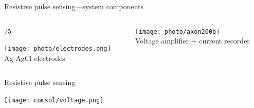 \begin{frame}[c]{Resistive pulse sensing---system components}
\begin{columns}[t]
	\end{columns}
	
	\vspace{1cm}
	
	\begin{columns}[t]
		\begin{column}[T]{\paperwidth/5}
			{\centering
				\texttt{[image: photo/electrodes.png]} \\
				{\footnotesize Ag-AgCl electrodes}
				\par
			}
		\end{column}
		
		
		\begin{column}[T]{.6\paperwidth}
			{\centering
				\texttt{[image: photo/axon200b]} \\
				Voltage amplifier + current recorder
				\par
			}
		\end{column}
	

	\end{columns}




% 	
% 
% 

\end{frame}


\begin{frame}[c]{Resistive pulse sensing}
	{\centering
		\texttt{[image: comsol/voltage.png]}
		\par
	}
\end{frame}


